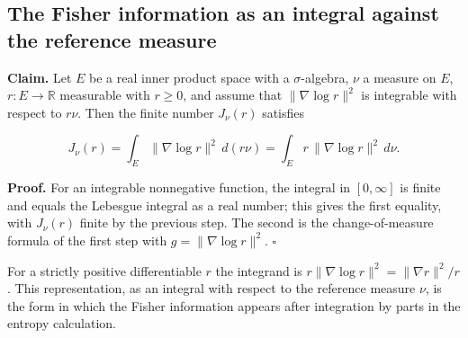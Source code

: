 \documentclass[11pt,a4paper]{report}
\begin{document}
\subsection{\texorpdfstring{The Fisher information as an integral against the reference measure}{The Fisher information as an integral against the reference measure}}
\label{report-step-UnadjustedLangevin-LSI-KLOfDensity-lean-7}


\textbf{Claim.} Let \(E\) be a real inner product space with a \(\sigma\)-algebra, \(\nu\) a measure on \(E\), \(r:E\to\mathbb R\) measurable with \(r\ge0\), and assume that \(\|\nabla\log r\|^2\) is integrable with respect to \(r\nu\). Then the finite number \(J_\nu(r)\) satisfies


\[J_\nu(r)=\int_E\|\nabla\log r\|^2\,d(r\nu)=\int_Er\,\|\nabla\log r\|^2\,d\nu.\]


\textbf{Proof.} For an integrable nonnegative function, the integral in \([0,\infty]\) is finite and equals the Lebesgue integral as a real number; this gives the first equality, with \(J_\nu(r)\) finite by the previous step. The second is the change-of-measure formula of the first step with \(g=\|\nabla\log r\|^2\). \(\square\)




For a strictly positive differentiable \(r\) the integrand is \(r\|\nabla\log r\|^2=\|\nabla r\|^2/r\). This representation, as an integral with respect to the reference measure \(\nu\), is the form in which the Fisher information appears after integration by parts in the entropy calculation.
\end{document}
